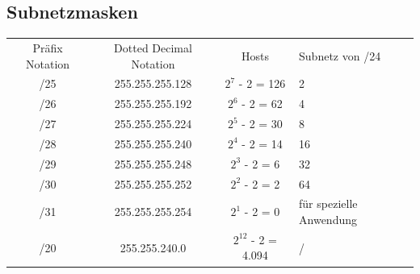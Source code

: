 \subsection*{Subnetzmasken}
\begin{table}[H]
	\begin{tabular}{cccl}
		Präfix Notation & Dotted Decimal Notation & Hosts & Subnetz von /24 \\
		/25 & 255.255.255.128 & $2^{7}$ - 2 = 126 & 2 \\
		/26 & 255.255.255.192 & $2^{6}$ - 2 = 62 & 4 \\
		/27 & 255.255.255.224 & $2^{5}$ - 2 = 30 & 8 \\
		/28 & 255.255.255.240 & $2^{4}$ - 2 = 14 & 16 \\
		/29 & 255.255.255.248 & $2^{3}$ - 2 = 6 & 32 \\
		/30 & 255.255.255.252 & $2^{2}$ - 2 = 2 & 64 \\
		/31 & 255.255.255.254 & $2^{1}$ - 2 = 0 & für spezielle Anwendung \\
		/20 & 255.255.240.0 & $2^{12}$ - 2 = 4.094 & /
	\end{tabular}
\end{table}

